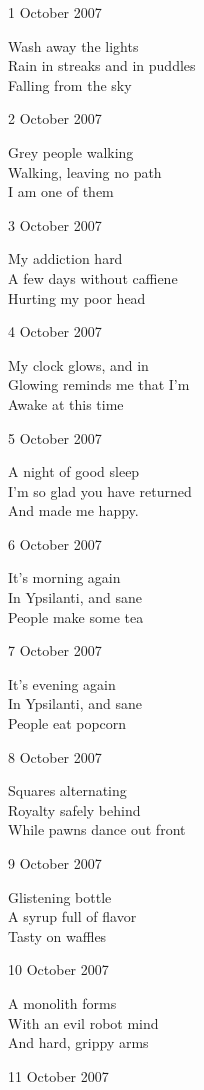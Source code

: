 \documentclass[12pt]{article}
\begin{document}
1 October 2007

Wash away the lights \\
Rain in streaks and in puddles \\
Falling from the sky

2 October 2007

Grey people walking \\
Walking, leaving no path \\
I am one of them

3 October 2007

My addiction hard \\
A few days without caffiene \\
Hurting my poor head

\newpage


4 October 2007

My clock glows, and in \\
Glowing reminds me that I'm \\
Awake at this time

5 October 2007

A night of good sleep \\
I'm so glad you have returned \\
And made me happy.

6 October 2007

It's morning again \\
In Ypsilanti, and sane \\
People make some tea

7 October 2007

It's evening again \\
In Ypsilanti, and sane \\
People eat popcorn

8 October 2007

Squares alternating \\
Royalty safely behind \\
While pawns dance out front 

9 October 2007

Glistening bottle \\
A syrup full of flavor \\
Tasty on waffles

10 October 2007

A monolith forms \\
With an evil robot mind \\
And hard, grippy arms


\newpage

11 October 2007
\end{document}
